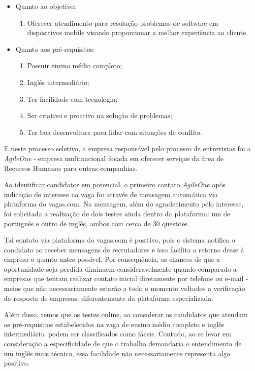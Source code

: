 \documentclass[12pt]{article}
\begin{document}
  \begin{itemize}
\item Quanto ao objetivo:
	\begin{enumerate}
	\item Oferecer atendimento para resolução problemas de software em dispositivos mobile 	visando proporcionar a melhor experiência ao cliente.
	\end{enumerate}
\end{itemize}


 \begin{itemize}
\item Quanto aos pré-requisitos:
	\begin{enumerate}
   	\item Possuir ensino médio completo;
	\item Inglês intermediário;
   	\item Ter facilidade com tecnologia; 
   	\item Ser criativo e proativo na solução de problemas; 
   	\item Ter boa desenvoltura para lidar com situações de conflito. 
	\end{enumerate}
\end{itemize}

E neste processo seletivo, a empresa responsável pelo processo de entrevistas foi a \emph {AgileOne} - empresa multinacional focada em oferecer serviços da área de Recursos Humanos para outras companhias.

Ao identificar candidatos em potencial, o primeiro contato  \emph {AgileOne} após indicação de interesse na vaga foi através de mensagem automática  via plataforma do vagas.com. Na mensagem, além do agradecimento pelo interesse, foi solicitada a realização de dois testes ainda dentro da plataforma: um de português e outro de inglês, ambos com cerca de 30 questões.

Tal contato via plataforma do vagas.com é positivo, pois o sistema notifica o candidato ao receber mensagens de recrutadores e isso facilita o retorno desse à empresa o quanto antes possível. Por consequência, as chances de que a oportunidade seja perdida diminuem consideravelmente quando comparado a empresas que tentam realizar contato inicial diretamente por telefone ou e-mail - meios que não necessariamente estarão a todo o momento voltados a verificação da resposta de empresas, diferentemente da plataforma especializada.

Além disso, temos que os testes online, ao considerar os candidatos que atendam os pré-requisitos estabelecidos na vaga de ensino médio completo e inglês intermediário, podem ser classificados como fáceis. Contudo, ao se levar em consideração a especificidade de que o trabalho demandaria o entendimento de um inglês mais técnico, essa facilidade não necessariamente representa algo positivo. 
\end{document}
